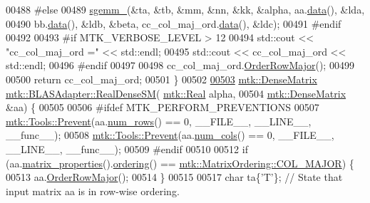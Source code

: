 \begin{DoxyCode}
00488 \textcolor{preprocessor}{  #else}
00489   \hyperlink{namespacemtk_adb7c0560326b8e57f255e58b87ec76b0}{sgemm\_}(&ta, &tb, &mm, &nn, &kk, &alpha, aa.\hyperlink{classmtk_1_1DenseMatrix_a0c33b8a9e01d157c61ddbdf807c25d84}{data}(), &lda,
00490          bb.\hyperlink{classmtk_1_1DenseMatrix_a0c33b8a9e01d157c61ddbdf807c25d84}{data}(), &ldb, &beta, cc\_col\_maj\_ord.\hyperlink{classmtk_1_1DenseMatrix_a0c33b8a9e01d157c61ddbdf807c25d84}{data}(), &ldc);
00491 \textcolor{preprocessor}{  #endif}
00492 
00493 \textcolor{preprocessor}{  #if MTK\_VERBOSE\_LEVEL > 12}
00494   std::cout << \textcolor{stringliteral}{"cc\_col\_maj\_ord ="} << std::endl;
00495   std::cout << cc\_col\_maj\_ord << std::endl;
00496 \textcolor{preprocessor}{  #endif}
00497 
00498   cc\_col\_maj\_ord.\hyperlink{classmtk_1_1DenseMatrix_ac2949efba3e8278335d45418c85433e4}{OrderRowMajor}();
00499 
00500   \textcolor{keywordflow}{return} cc\_col\_maj\_ord;
00501 \}
00502 
\hypertarget{mtk__blas__adapter_8cc_source_l00503}{}\hyperlink{classmtk_1_1BLASAdapter_a0dd80d043615a95f11b7341ce69b44d3}{00503} \hyperlink{classmtk_1_1DenseMatrix}{mtk::DenseMatrix} \hyperlink{classmtk_1_1BLASAdapter_a0dd80d043615a95f11b7341ce69b44d3}{mtk::BLASAdapter::RealDenseSM}(
      \hyperlink{group__c01-roots_gac080bbbf5cbb5502c9f00405f894857d}{mtk::Real} alpha,
00504                                                \hyperlink{classmtk_1_1DenseMatrix}{mtk::DenseMatrix} &aa) \{
00505 
00506 \textcolor{preprocessor}{  #ifdef MTK\_PERFORM\_PREVENTIONS}
00507   \hyperlink{classmtk_1_1Tools_a332324c6f25e66be9dff48c5987a3b9f}{mtk::Tools::Prevent}(aa.\hyperlink{classmtk_1_1DenseMatrix_a53f3afb3b6a8d21854458aaa9663cc74}{num\_rows}() == 0, \_\_FILE\_\_, \_\_LINE\_\_, \_\_func\_\_);
00508   \hyperlink{classmtk_1_1Tools_a332324c6f25e66be9dff48c5987a3b9f}{mtk::Tools::Prevent}(aa.\hyperlink{classmtk_1_1DenseMatrix_a41747502d468c6728a4be31501b16e0e}{num\_cols}() == 0, \_\_FILE\_\_, \_\_LINE\_\_, \_\_func\_\_);
00509 \textcolor{preprocessor}{  #endif}
00510 
00512   \textcolor{keywordflow}{if} (aa.\hyperlink{classmtk_1_1DenseMatrix_a5aa83a0643f27a4652ea97630edf7143}{matrix\_properties}().\hyperlink{classmtk_1_1Matrix_a13cd17621652cd5551ff98549bd94df7}{ordering}() == 
      \hyperlink{namespacemtk_ga622801bd9f912d0f976c3e383f5f581ca34d2765ffc490951febdcca04bc4f7cd}{mtk::MatrixOrdering::COL\_MAJOR}) \{
00513     aa.\hyperlink{classmtk_1_1DenseMatrix_ac2949efba3e8278335d45418c85433e4}{OrderRowMajor}();
00514   \}
00515 
00517   \textcolor{keywordtype}{char} ta\{\textcolor{charliteral}{'T'}\}; \textcolor{comment}{// State that input matrix aa is in row-wise ordering.}

\end{DoxyCode}
